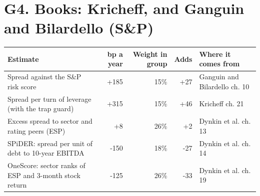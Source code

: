 \documentclass[11pt,a4paper]{article}
\begin{document}
\section*{G4. Books: Kricheff, and Ganguin and Bilardello (S\&P)}
\par\noindent{}
\begin{center}\footnotesize\setlength{\tabcolsep}{3.5pt}\begin{tabular}{@{}p{6.2cm}rrrp{4.2cm}@{}}\toprule
Estimate & bp a year & Weight in group & Adds & Where it comes from \\\midrule
Spread against the S\&P risk score & +185 & 15\% & +27 & Ganguin and Bilardello ch. 10 \\
Spread per turn of leverage (with the trap guard) & +315 & 15\% & +46 & Kricheff ch. 21 \\
Excess spread to sector and rating peers (ESP) & +8 & 26\% & +2 & Dynkin et al. ch. 13 \\
SPiDER: spread per unit of debt to 10-year EBITDA & -150 & 18\% & -27 & Dynkin et al. ch. 14 \\
OneScore: sector ranks of ESP and 3-month stock return & -125 & 26\% & -33 & Dynkin et al. ch. 19 \\
\bottomrule\end{tabular}\end{center}
\end{document}
